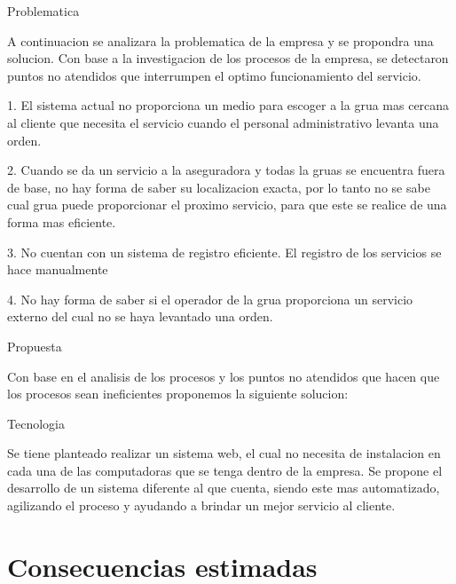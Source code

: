 \begin{description}



\item Problematica
\item A continuacion se analizara la problematica de la empresa y se propondra una solucion.
Con base a la investigacion de los procesos de la empresa, se detectaron puntos no atendidos que interrumpen el optimo funcionamiento del servicio.
\item 1. El sistema actual no proporciona un medio para escoger a la grua mas cercana al cliente que necesita el servicio cuando el personal administrativo levanta una orden.
\item 2. Cuando se da un servicio a la aseguradora y todas la gruas se encuentra fuera de base, no hay forma de saber su localizacion exacta, por lo tanto no se sabe cual grua puede proporcionar el proximo servicio, para que este se realice de una forma mas eficiente.
\item 3. No cuentan con un sistema de registro eficiente. El registro de los servicios se hace manualmente
\item 4. No hay forma de saber si el operador de la grua proporciona un servicio externo del cual no se haya levantado una orden.
\item	Propuesta
\item Con base en el analisis de los procesos y los puntos no atendidos que hacen que los procesos sean ineficientes proponemos la siguiente solucion:
\item Tecnologia
\item Se tiene planteado realizar un sistema web, el cual no necesita de instalacion en cada una de las computadoras que se tenga dentro de la empresa. Se propone el desarrollo de un sistema diferente al que cuenta, siendo este mas automatizado, agilizando el proceso y ayudando a brindar un mejor servicio al cliente.


\end{description}


\section{Consecuencias estimadas}

